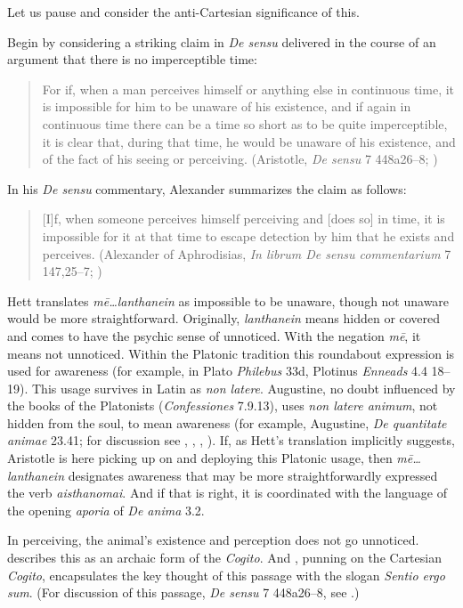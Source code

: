 Let us pause and consider the anti-Cartesian significance of this.

Begin by considering a striking claim in \emph{De sensu} delivered in the course of an argument that there is no imperceptible time:
\begin{quote}
	For if, when a man perceives himself or anything else in continuous time, it is impossible for him to be unaware of his existence, and if again in continuous time there can be a time so short as to be quite imperceptible, it is clear that, during that time, he would be unaware of his existence, and of the fact of his seeing or perceiving. (Aristotle, \emph{De sensu} 7 448a26–8; \citealt[277]{Hett:1936fk})
\end{quote}
In his \emph{De sensu} commentary, Alexander summarizes the claim as follows:
\begin{quote}
	[I]f, when someone perceives himself perceiving and [does so] in time, it is impossible for it at that time to escape detection by him that he exists and perceives. (Alexander of Aphrodisias, \emph{In librum De sensu commentarium} 7 147,25–7; \citealt[134]{Towey:2000qn})
\end{quote}
Hett translates \emph{mē\ldots lanthanein} as impossible to be unaware, though not unaware would be more straightforward. Originally, \emph{lanthanein} means hidden or covered and comes to have the psychic sense of unnoticed. With the negation \emph{mē}, it means not unnoticed. Within the Platonic tradition this roundabout expression is used for awareness (for example, in Plato \emph{Philebus} 33d, Plotinus \emph{Enneads} 4.4 18–19). This usage survives in Latin as \emph{non latere}. Augustine, no doubt influenced by the books of the Platonists (\emph{Confessiones} 7.9.13), uses \emph{non latere animum}, not hidden from the soul, to mean awareness (for example, Augustine, \emph{De quantitate animae} 23.41; for discussion see \citealt[86 n15]{ODaly:1987fq}, \citealt[275 n61]{Brittain:2002hl}, \citealt[chapter 12]{Sorabji:2006aa}, \citealt[14–5]{Kalderon:2021xs}). If, as Hett's translation implicitly suggests, Aristotle is here picking up on and deploying this Platonic usage, then \emph{mē\ldots lanthanein} designates awareness that may be more straightforwardly expressed the verb \emph{aisthanomai}. And if that is right, it is coordinated with the language of the opening \emph{aporia} of \emph{De anima} 3.2.

In perceiving, the animal's existence and perception does not go unnoticed. \citet{Brehier:1942dl} describes this as an archaic form of the \emph{Cogito}. And \citet[361–2]{Mondolfo:1953ce}, punning on the Cartesian \emph{Cogito}, encapsulates the key thought of this passage with the slogan \emph{Sentio ergo sum}. (For discussion of this passage, \emph{De sensu} 7 448a26–8, see \citealt[chapter 5]{Heller-Roazen:2007ee}.)

